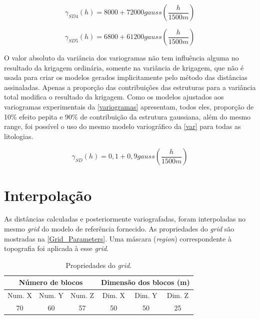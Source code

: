 \begin{equation}
\label{varsd4}
\gamma_{SD4}(h)=8000  +72000  gauss\left(\frac{h}{1500m}\right)
\end{equation}

\begin{equation}
\label{varsd5}
\gamma_{SD5}(h)=6800   +61200   gauss\left(\frac{h}{1500m}\right)
\end{equation}

O valor absoluto da variância dos variogramas não tem influência alguma no resultado da krigagem ordinária, somente na variância de krigagem, que não é usada para criar os modelos gerados implicitamente pelo método das distâncias assinaladas. Apenas a proporção das contribuições das estruturas para a variância total modifica o resultado da krigagem. Como os modelos ajustados aos variogramas experimentais da \autoref{variogramas} apresentam, todos eles, proporção de 10\% efeito pepita e 90\% de contribuição da estrutura gaussiana, além do mesmo range, foi possível o uso do mesmo modelo variográfico da \autoref{var} para todas as litologias.

\begin{equation}
\label{var}
\gamma_{SD}(h)=0,1+0,9gauss\left(\frac{h}{1500m}\right)
\end{equation}

\section{Interpolação}

As distâncias calculadas e posteriormente variografadas, foram interpoladas no mesmo \textit{grid} do modelo de referência fornecido. As propriedades do \textit{grid} são mostradas na \autoref{Grid_Parameters}. Uma máscara (\textit{region}) correspondente à topografia foi aplicada à esse \textit{grid}.  

\begin{table}[!htb]
\centering
\caption{Propriedades do \textit{grid}.}
\label{Grid_Parameters}
\begin{tabular}{cccccc}
\multicolumn{3}{c}{Número de blocos} & \multicolumn{3}{c}{Dimensão dos blocos (m)} \\ \hline
Num. X     & Num. Y     & Num. Z     & Dim. X     & Dim. Y     & Dim. Z     \\
70         & 60         & 57         & 50        & 50        & 25        \\ \hline
\end{tabular}
\end{table}

